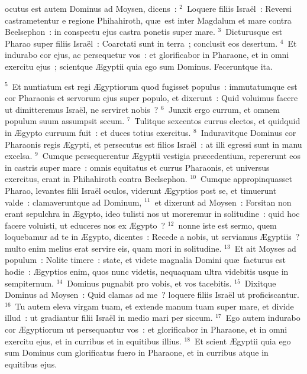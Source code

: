\bchapter
{}ocutus est autem Dominus ad Moysen, dicens~:
${}^{2}$~Loquere filiis Isra\"el~: Reversi castrametentur e regione Phihahiroth, qu\ae\ est inter Magdalum et mare contra Beelsephon~: in conspectu ejus castra ponetis super mare.
${}^{3}$~Dicturusque est Pharao super filiis Isra\"el~: Coarctati sunt in terra~; conclusit eos desertum.
${}^{4}$~Et indurabo cor ejus, ac persequetur vos~: et glorificabor in Pharaone, et in omni exercitu ejus~; scientque \AE gyptii quia ego sum Dominus. Feceruntque ita.


${}^{5}$~Et nuntiatum est regi \AE gyptiorum quod fugisset populus~: immutatumque est cor Pharaonis et servorum ejus super populo, et dixerunt~: Quid voluimus facere ut dimitteremus Isra\"el, ne serviret nobis~?
${}^{6}$~Junxit ergo currum, et omnem populum suum assumpsit secum.
${}^{7}$~Tulitque sexcentos currus electos, et quidquid in \AE gypto curruum fuit~: et duces totius exercitus.
${}^{8}$~Induravitque Dominus cor Pharaonis regis \AE gypti, et persecutus est filios Isra\"el~: at illi egressi sunt in manu excelsa.
${}^{9}$~Cumque persequerentur \AE gyptii vestigia pr\ae cedentium, repererunt eos in castris super mare~: omnis equitatus et currus Pharaonis, et universus exercitus, erant in Phihahiroth contra Beelsephon.
${}^{10}$~Cumque appropinquasset Pharao, levantes filii Isra\"el oculos, viderunt \AE gyptios post se, et timuerunt valde~: clamaveruntque ad Dominum,
${}^{11}$~et dixerunt ad Moysen~: Forsitan non erant sepulchra in \AE gypto, ideo tulisti nos ut moreremur in solitudine~: quid hoc facere voluisti, ut educeres nos ex \AE gypto~?
${}^{12}$~nonne iste est sermo, quem loquebamur ad te in \AE gypto, dicentes~: Recede a nobis, ut serviamus \AE gyptiis~? multo enim melius erat servire eis, quam mori in solitudine.
${}^{13}$~Et ait Moyses ad populum~: Nolite timere~: state, et videte magnalia Domini qu\ae\ facturus est hodie~: \AE gyptios enim, quos nunc videtis, nequaquam ultra videbitis usque in sempiternum.
${}^{14}$~Dominus pugnabit pro vobis, et vos tacebitis.
${}^{15}$~Dixitque Dominus ad Moysen~: Quid clamas ad me~? loquere filiis Isra\"el ut proficiscantur.
${}^{16}$~Tu autem eleva virgam tuam, et extende manum tuam super mare, et divide illud~: ut gradiantur filii Isra\"el in medio mari per siccum.
${}^{17}$~Ego autem indurabo cor \AE gyptiorum ut persequantur vos~: et glorificabor in Pharaone, et in omni exercitu ejus, et in curribus et in equitibus illius.
${}^{18}$~Et scient \AE gyptii quia ego sum Dominus cum glorificatus fuero in Pharaone, et in curribus atque in equitibus ejus.
